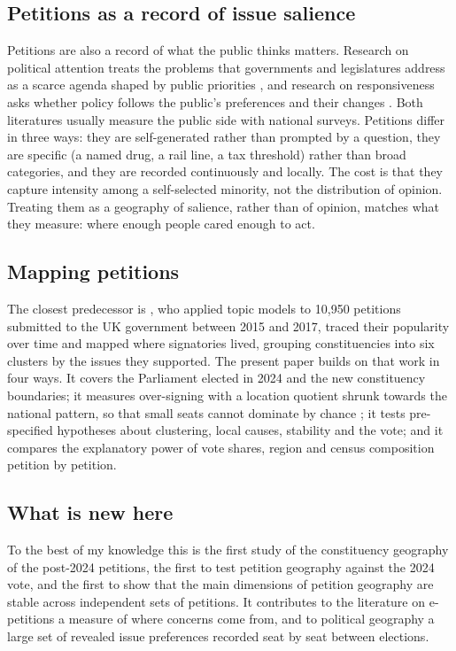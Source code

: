 \documentclass[11pt,a4paper]{article}
\begin{document}
\subsection{Petitions as a record of issue salience}
Petitions are also a record of what the public thinks matters. Research on political attention treats the problems that governments and legislatures address as a scarce agenda shaped by public priorities \citep{jonesbaumgartner2005}, and research on responsiveness asks whether policy follows the public's preferences and their changes \citep{sorokawlezien2010}. Both literatures usually measure the public side with national surveys. Petitions differ in three ways: they are self-generated rather than prompted by a question, they are specific (a named drug, a rail line, a tax threshold) rather than broad categories, and they are recorded continuously and locally. The cost is that they capture intensity among a self-selected minority, not the distribution of opinion. Treating them as a geography of salience, rather than of opinion, matches what they measure: where enough people cared enough to act.

\subsection{Mapping petitions}
The closest predecessor is \citet{vidgen2020}, who applied topic models to 10,950 petitions submitted to the UK government between 2015 and 2017, traced their popularity over time and mapped where signatories lived, grouping constituencies into six clusters by the issues they supported. The present paper builds on that work in four ways. It covers the Parliament elected in 2024 and the new constituency boundaries; it measures over-signing with a location quotient shrunk towards the national pattern, so that small seats cannot dominate by chance \citep{claytonkaldor1987}; it tests pre-specified hypotheses about clustering, local causes, stability and the vote; and it compares the explanatory power of vote shares, region and census composition petition by petition.

\subsection{What is new here}
To the best of my knowledge this is the first study of the constituency geography of the post-2024 petitions, the first to test petition geography against the 2024 vote, and the first to show that the main dimensions of petition geography are stable across independent sets of petitions. It contributes to the literature on e-petitions a measure of where concerns come from, and to political geography a large set of revealed issue preferences recorded seat by seat between elections.
\end{document}
